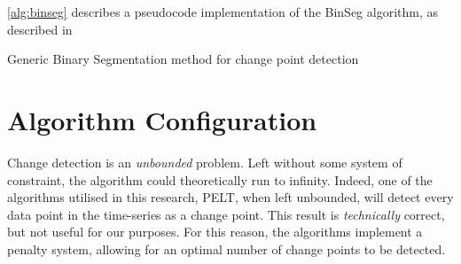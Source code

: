 \documentclass{uvamscse}	%
\begin{document}
\autoref{alg:binseg} describes a pseudocode implementation of the BinSeg algorithm, as described in \cite{Eckley2011}\newline

\begin{algorithm}[H]
    \label{alg:binseg}
    \caption{Generic Binary Segmentation method for change point detection}
    \DontPrintSemicolon
\end{algorithm}

\section{Algorithm Configuration}

Change detection is an \emph{unbounded} problem. Left without some system of constraint, the algorithm could theoretically run to infinity. Indeed, one of the algorithms utilised in this research, PELT, when left unbounded, will detect every data point in the time-series as a change point. This result is \textit{technically} correct, but not useful for our purposes. For this reason, the algorithms implement a penalty system, allowing for an optimal number of change points to be detected.
\end{document}
